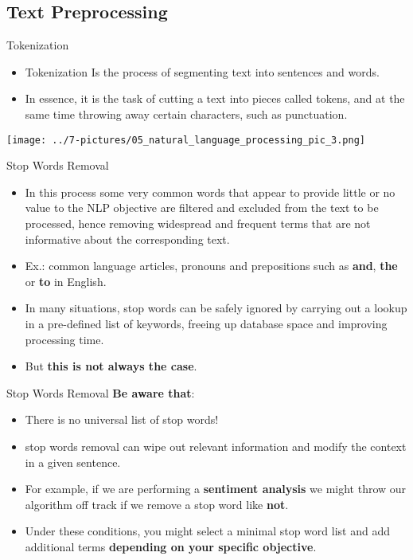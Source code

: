 \documentclass[11pt]{beamer}
\begin{document}
\subsection{Text Preprocessing}
\begin{frame}{Tokenization}
	\begin{itemize}
		\item Tokenization Is the process of segmenting text into sentences and words. 
		\item In essence, it is the task of cutting a text into pieces called tokens, and at the same time throwing away certain characters, such as punctuation. 
	\end{itemize}
	\begin{center}
	\texttt{[image: ../7-pictures/05\_natural\_language\_processing\_pic\_3.png]}
	\end{center}
\end{frame}
\begin{frame}{Stop Words Removal}
	\begin{itemize}
		\item In this process some very common words that appear to provide little or no value to the NLP objective are filtered and excluded from the text to be processed, hence removing widespread and frequent terms that are not informative about the corresponding text.
		\item Ex.: common language articles, pronouns and prepositions such as \textbf{and}, \textbf{ the} or \textbf{ to} in English.
		\item In many situations, stop words can be safely ignored by carrying out a lookup in a pre-defined list of keywords, freeing up database space and improving processing time.
		\item But \textbf{this is not always the case}.
	\end{itemize}
\end{frame}
\begin{frame}{Stop Words Removal}
	\textbf{Be aware that}:
	\begin{itemize}
		\item There is no universal list of stop words!
		\item stop words removal can wipe out relevant information and modify the context in a given sentence. 
		\item For example, if we are performing a \textbf{sentiment analysis} we might throw our algorithm off track if we remove a stop word like \textbf{not}. 
		\item Under these conditions, you might select a minimal stop word list and add additional terms \textbf{depending on your specific objective}.
	\end{itemize}
\end{frame}
\end{document}
